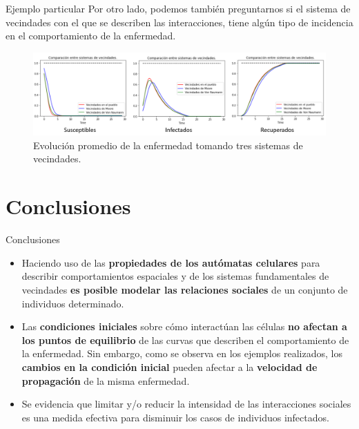 \documentclass[9pt]{beamer}
\begin{document}
\begin{frame}{Ejemplo particular}
Por otro lado, podemos también preguntarnos si el sistema de vecindades con el que se describen las interacciones, tiene algún tipo de incidencia en el comportamiento de la enfermedad. %
\begin{figure}[h]
  \centering
    \includegraphics[width=1\textwidth]{Imagenes/comparacionSistemasVecindades.PNG}
    \caption{Evolución promedio de la enfermedad tomando tres sistemas de vecindades.}
    \label{fig:comparacionSistemasDeVecindades}
\end{figure}
\end{frame}

\section{Conclusiones}
\begin{frame}{Conclusiones}
\begin{itemize}
    \item Haciendo uso de las \textbf{propiedades de los autómatas celulares} para describir comportamientos espaciales y de los sistemas fundamentales de vecindades \textbf{es posible modelar las relaciones sociales} de un conjunto de individuos determinado.
    \item Las \textbf{condiciones iniciales} sobre cómo interactúan las células \textbf{no afectan a los puntos de equilibrio} de las curvas que describen el comportamiento de la enfermedad. Sin embargo, como se observa en los ejemplos realizados, los \textbf{cambios en la condición inicial} pueden afectar a la \textbf{velocidad de propagación} de la misma enfermedad.
    \item Se evidencia que limitar y/o reducir la intensidad de las interacciones sociales es una medida efectiva para disminuir los casos de individuos infectados.
\end{itemize}
\end{frame}
\end{document}
